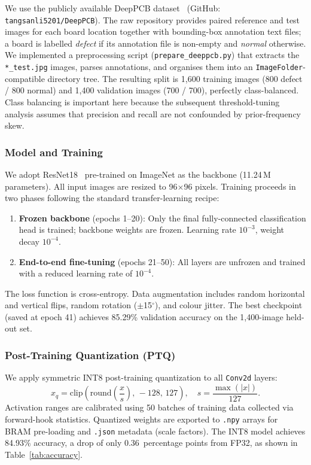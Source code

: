 \documentclass[conference]{IEEEtran}
\begin{document}
We use the publicly available DeepPCB dataset~\cite{tang2019deeppcb} (GitHub: \texttt{tangsanli5201/DeepPCB}). The raw repository provides paired reference and test images for each board location together with bounding-box annotation text files; a board is labelled \emph{defect} if its annotation file is non-empty and \emph{normal} otherwise. We implemented a preprocessing script (\texttt{prepare\_deeppcb.py}) that extracts the \texttt{*\_test.jpg} images, parses annotations, and organises them into an \texttt{ImageFolder}-compatible directory tree. The resulting split is 1{,}600 training images (800 defect / 800 normal) and 1{,}400 validation images (700 / 700), perfectly class-balanced. Class balancing is important here because the subsequent threshold-tuning analysis assumes that precision and recall are not confounded by prior-frequency skew.

\subsubsection{Model and Training}

We adopt ResNet18~\cite{he2016resnet} pre-trained on ImageNet as the backbone (11.24\,M parameters). All input images are resized to 96$\times$96 pixels. Training proceeds in two phases following the standard transfer-learning recipe:

\begin{enumerate}
    \item \textbf{Frozen backbone} (epochs 1--20): Only the final fully-connected classification head is trained; backbone weights are frozen. Learning rate $10^{-3}$, weight decay $10^{-4}$.
    \item \textbf{End-to-end fine-tuning} (epochs 21--50): All layers are unfrozen and trained with a reduced learning rate of $10^{-4}$.
\end{enumerate}

The loss function is cross-entropy. Data augmentation includes random horizontal and vertical flips, random rotation ($\pm$15$^\circ$), and colour jitter. The best checkpoint (saved at epoch 41) achieves 85.29\% validation accuracy on the 1{,}400-image held-out set.

\subsubsection{Post-Training Quantization (PTQ)}
\label{sec:ptq}

We apply symmetric INT8 post-training quantization to all \texttt{Conv2d} layers:
\begin{equation}
x_q = \text{clip}\!\left(\text{round}\!\left(\frac{x}{s}\right),\,-128,\,127\right), \quad s = \frac{\max(|x|)}{127}.
\end{equation}
Activation ranges are calibrated using 50 batches of training data collected via forward-hook statistics. Quantized weights are exported to \texttt{.npy} arrays for BRAM pre-loading and \texttt{.json} metadata (scale factors). The INT8 model achieves 84.93\% accuracy, a drop of only 0.36~percentage points from FP32, as shown in Table~\ref{tab:accuracy}.
\end{document}
